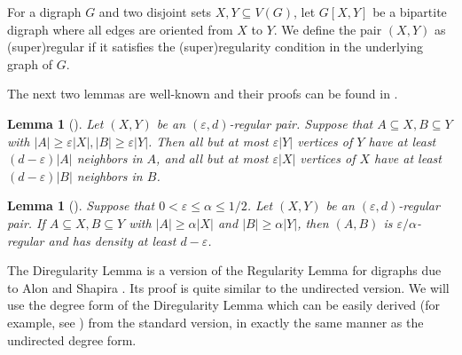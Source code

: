 \documentclass[11pt,a4paper,reqno]{amsart}
\newtheorem{lemma}[theorem]{Lemma}
\theoremstyle{definition} %
\begin{document}
 For a digraph $G$ and two disjoint sets $X,Y\subseteq V(G)$, let $G[X,Y]$ be a bipartite digraph where all edges are oriented from $X$ to $Y$. We define the pair $(X,Y)$ as (super)regular if it satisfies the (super)regularity condition in the underlying graph of $G$.


The next two lemmas are well-known and their proofs can be found  in \cite{taylor2013}.
	\begin{lemma}[\cite{taylor2013}]
		\label{LEM-fewvxswithsmalld}
		Let $(X,Y)$ be an $(\varepsilon,d)$-regular pair. Suppose that $A\subseteq X, B\subseteq Y$ with $|A|\geqslant  \varepsilon|X|, |B|\geqslant  \varepsilon|Y|$. 
        Then all but at most $\varepsilon|Y|$ vertices of $Y$ have at least $(d-\varepsilon)|A|$ neighbors in $A$, and all but at most $\varepsilon|X|$ vertices of $X$ have at least $(d-\varepsilon)|B|$ neighbors in $B$.
	\end{lemma}

    
\begin{lemma}[\cite{taylor2013}]
		\label{LEM-regulartosuper}
		Suppose  that $0<\varepsilon\leqslant  \alpha\leqslant  1/2$. Let $(X,Y)$ be an $(\varepsilon,d)$-regular pair. If $A\subseteq X, B\subseteq Y$ with $|A|\geqslant  \alpha|X|$ and $|B|\geqslant  \alpha|Y|$, then $(A,B)$ is $\varepsilon/\alpha$-regular and has density at least $d-\varepsilon$.
	\end{lemma}
	

The Diregularity Lemma is a version of the Regularity Lemma for digraphs due to Alon and
Shapira \cite{alon2003testing}.
Its proof is quite similar to the undirected version.
We will use the degree form of the Diregularity Lemma which can be easily derived (for example,  see \cite{young2007extremal}) from the standard version, in exactly the same manner as the undirected degree form.
\end{document}
